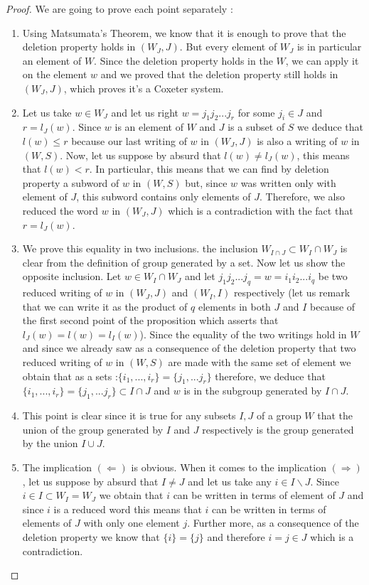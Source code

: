 \documentclass[envcountsame,envcountchap]{svmono}
\newcommand{\sub}{\subset}
\begin{document}
\begin{proof}
	We are going to prove each point separately :
	\begin{enumerate}
		\item Using Matsumata's Theorem, we know that it is enough to prove that the deletion property holds in $(W_J,J)$. But every element of $W_J$ is in particular an element of $W$. Since the deletion property holds in the $W$, we can apply it on the element $w$ and we proved that the deletion property still holds in $(W_J,J)$, which proves it's a Coxeter system.
		\item Let us take $w\in W_J$ and let us right $w=j_1j_2...j_r$ for some $j_i\in J$ and $r=l_J(w)$. Since $w$ is an element of $W$ and $J$ is a subset of $S$ we deduce that $l(w)\leq r$ because our last writing of $w$ in $(W_J,J)$ is also a writing of $w$ in $(W,S)$. Now, let us suppose by absurd that $l(w)\not=l_J(w)$, this means that $l(w)<r$. In particular, this means that we can find by deletion property a subword of $w$ in $(W,S)$ but, since $w$ was written only with element of $J$, this subword contains only elements of $J$. Therefore, we also reduced the word $w$ in $(W_J,J)$ which is a contradiction with the fact that $r=l_J(w)$.
		\item We prove this equality in two inclusions. the inclusion $W_{I\cap J}\sub W_I\cap W_J $ is clear from the definition of group generated by a set. Now let us show the opposite inclusion. Let $w\in W_I\cap W_J$ and let $j_1j_2...j_q=w=i_1i_2...i_q$ be two reduced writing of $w$ in $(W_J,J)$ and $(W_I,I)$ respectively (let us remark that we can write it as the product of $q$ elements in both $J$ and $I$ because of the first second point of the proposition which asserts that $l_J(w)=l(w)=l_I(w)$). Since the equality of the two writings hold in $W$ and since we already saw as a consequence of the deletion property that two reduced writing of $w$ in $(W,S)$ are made with the same set of element we obtain that as a sets :$\{i_1,...,i_r\}=\{j_1,...j_r\}$ therefore, we deduce that $\{i_1,...,i_r\}=\{j_1,...j_r\}\sub I\cap J$ and $w$ is in the subgroup generated by $I\cap J$.
		\item This point is clear since it is true for any subsets $I,J$ of a group $W$ that the union of the group generated by $I$ and $J$ respectively is the group generated by the union $I\cup J$.
		\item The implication $(\Leftarrow)$ is obvious. When it comes to the implication $(\Rightarrow)$, let us suppose by absurd that $I\not=J$ and let us take any $i\in I\backslash J$. Since $i\in I\sub W_I=W_J$ we obtain that $i$ can be written in terms of element of $J$ and since $i$ is a reduced word this means that $i$ can be written in terms of elements of $J$ with only one element $j$. Further more, as a consequence of the deletion property we know that $\{i\}=\{j\}$ and therefore $i=j\in J$ which is a contradiction.
	\end{enumerate}
\end{proof}
\end{document}
